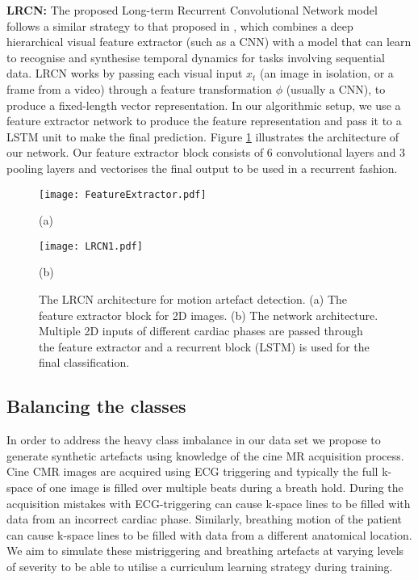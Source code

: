 \documentclass[preprint,12pt,authoryear]{elsarticle}
\begin{document}
\textbf{LRCN:} The proposed Long-term  Recurrent  Convolutional Network model follows a similar strategy to that proposed in \cite{Donahue2017}, which combines a deep hierarchical visual feature extractor (such as a CNN) with a model that can learn  to  recognise  and  synthesise  temporal  dynamics  for tasks involving sequential data. LRCN works by passing each  visual  input $x_{t}$ (an  image  in  isolation,  or  a  frame  from  a  video)  through a feature transformation $\phi$ (usually a CNN), to produce a fixed-length vector representation. In our algorithmic setup, we use a feature extractor network to produce the feature representation and pass it to a LSTM unit to make the final prediction. Figure \ref{fig:ModelLRCN}  illustrates the architecture of our network. Our feature extractor block consists of  6 convolutional layers and 3 pooling layers and vectorises the final output to be used in a recurrent fashion.



 \begin{figure}[tb]

\begin{minipage}[b]{0.48\linewidth}
  \centering
  \centerline{\texttt{[image: FeatureExtractor.pdf]}}
  \centerline{(a)}\medskip
\end{minipage}
\hfill
\begin{minipage}[b]{0.48\linewidth}
  \centering
  \centerline{\texttt{[image: LRCN1.pdf]}}
  \centerline{(b)}\medskip
\end{minipage}
\hfill


\caption{ The LRCN architecture for motion artefact detection. (a) The  feature extractor block for 2D images. (b) The network architecture. Multiple 2D inputs of different cardiac phases are passed through the feature extractor and a recurrent block (LSTM) is used for the final classification.}
\label{fig:ModelLRCN}
\end{figure}


\subsection{Balancing the classes}
\label{sec:balance}


In order to address the heavy class imbalance in our data set we propose to generate synthetic artefacts using knowledge of the cine MR acquisition process. Cine CMR images are acquired using ECG triggering and typically the full k-space of one image is filled over multiple beats during a breath hold. During the acquisition mistakes with ECG-triggering can cause k-space lines to be filled with data from an incorrect cardiac phase. Similarly, breathing motion of the patient can cause k-space lines to be filled with data from a different anatomical location. We aim to simulate these mistriggering and breathing artefacts at varying levels of severity to be able to utilise a curriculum learning strategy during training.
\end{document}
